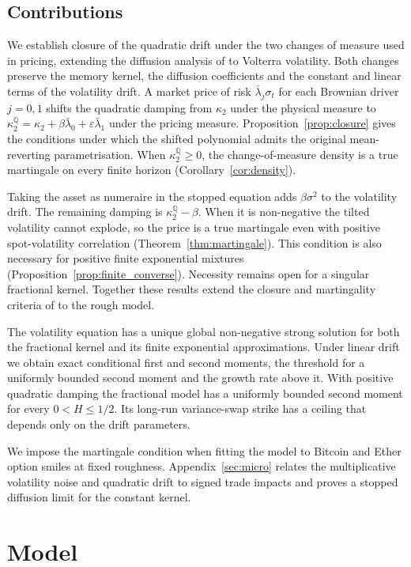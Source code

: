 \documentclass[11pt,a4paper]{article}
\theoremstyle{definition}
\newcommand{\Q}{\mathbb{Q}}
\begin{document}
\subsection{Contributions}\label{sec:contributions}
We establish closure of the quadratic drift under the two changes of measure used in pricing, extending the diffusion analysis of \citet{SeppRakhmonov2023} to Volterra volatility. Both changes preserve the memory kernel, the diffusion coefficients and the constant and linear terms of the volatility drift. A market price of risk $\bar\lambda_j\sigma_t$ for each Brownian driver $j=0,1$ shifts the quadratic damping from $\kappa_2$ under the physical measure to $\kappa_2^{\Q}=\kappa_2+\beta\bar\lambda_0+\varepsilon\bar\lambda_1$ under the pricing measure. Proposition~\ref{prop:closure} gives the conditions under which the shifted polynomial admits the original mean-reverting parametrisation. When $\kappa_2^{\Q}\ge0$, the change-of-measure density is a true martingale on every finite horizon (Corollary~\ref{cor:density}).

Taking the asset as numeraire in the stopped equation adds $\beta\sigma^2$ to the volatility drift. The remaining damping is $\kappa_2^{\Q}-\beta$. When it is non-negative the tilted volatility cannot explode, so the price is a true martingale even with positive spot-volatility correlation (Theorem~\ref{thm:martingale}). This condition is also necessary for positive finite exponential mixtures (Proposition~\ref{prop:finite_converse}). Necessity remains open for a singular fractional kernel. Together these results extend the closure and martingality criteria of \citet{SeppRakhmonov2026} to the rough model.

The volatility equation has a unique global non-negative strong solution for both the fractional kernel and its finite exponential approximations. Under linear drift we obtain exact conditional first and second moments, the threshold for a uniformly bounded second moment and the growth rate above it. With positive quadratic damping the fractional model has a uniformly bounded second moment for every $0<H\le1/2$. Its long-run variance-swap strike has a ceiling that depends only on the drift parameters.

We impose the martingale condition when fitting the model to Bitcoin and Ether option smiles at fixed roughness. Appendix~\ref{sec:micro} relates the multiplicative volatility noise and quadratic drift to signed trade impacts and proves a stopped diffusion limit for the constant kernel.
\section{Model}\label{sec:model}
\end{document}
